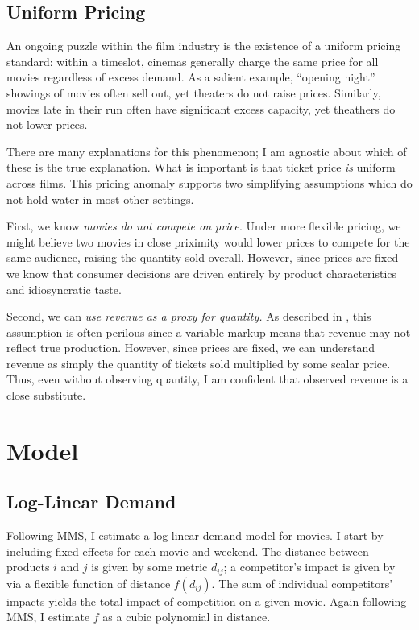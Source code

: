 \documentclass{article}
\begin{document}
\subsection{Uniform Pricing}

An ongoing puzzle within the film industry is the existence of a uniform pricing standard: within a timeslot, cinemas generally charge the same price for all movies regardless of excess demand. As a salient example, ``opening night'' showings of movies often sell out, yet theaters do not raise prices. Similarly, movies late in their run often have significant excess capacity, yet theathers do not lower prices.

There are many explanations for this phenomenon; I am agnostic about which of these is the true explanation. What is important is that ticket price \emph{is} uniform across films. This pricing anomaly supports two simplifying assumptions which do not hold water in most other settings.

First, we know \emph{movies do not compete on price.} Under more flexible pricing, we might believe two movies in close priximity would lower prices to compete for the same audience, raising the quantity sold overall. However, since prices are fixed we know that consumer decisions are driven entirely by product characteristics and idiosyncratic taste.

Second, we can \emph{use revenue as a proxy for quantity.} As described in \textcite{bond2021JME}, this assumption is often perilous since a variable markup means that revenue may not reflect true production. However, since prices are fixed, we can understand revenue as simply the quantity of tickets sold multiplied by some scalar price. Thus, even without observing quantity, I am confident that observed revenue is a close substitute. 


\section{Model} 

\subsection{Log-Linear Demand}

Following MMS, I estimate a log-linear demand model for movies. I start by including fixed effects for each movie and weekend. The distance between products $i$ and $j$ is given by some metric $d_{ij}$; a competitor's impact is given by via a flexible function of distance $f(d_{ij})$. The sum of individual competitors' impacts yields the total impact of competition on a given movie. Again following MMS, I estimate $f$ as a cubic polynomial in distance.
\end{document}
